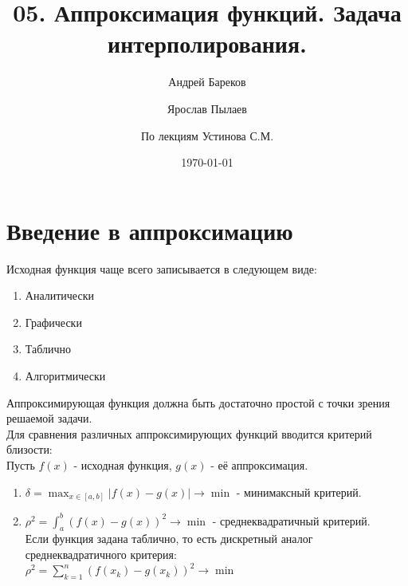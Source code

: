 \documentclass[a4paper,11pt]{article}
\title{05. Аппроксимация функций. Задача интерполирования.}
\author{Андрей Бареков \and Ярослав Пылаев \and По лекциям Устинова С.М.}
\date{\today}
\begin{document}
\maketitle
\newpage

\section{Введение в аппроксимацию}
Исходная функция чаще всего записывается в следующем виде:
\begin{enumerate}
  \item Аналитически
  \item Графически
  \item Таблично
  \item Алгоритмически
\end{enumerate}
Аппроксимирующая функция должна быть достаточно простой с точки зрения решаемой задачи. \\
\newline
Для сравнения различных аппроксимирующих функций вводится критерий близости: \\
Пусть $f(x)$ - исходная функция, $g(x)$ - её аппроксимация.
\begin{enumerate}
  \item \(\delta = \max_{x \in [a,b]} |f(x) - g(x)| \to \min\) - минимаксный критерий.
  \item \(\rho^2 = \int_{a}^{b} (f(x) - g(x))^2 \to \min\) - среднеквадратичный критерий. \\
        Если функция задана таблично, то есть дискретный аналог среднеквадратичного критерия: \\
        \(\rho^2 = \sum_{k=1}^{n} (f(x_k) - g(x_k))^2 \to \min\)
\end{enumerate}
\end{document}

